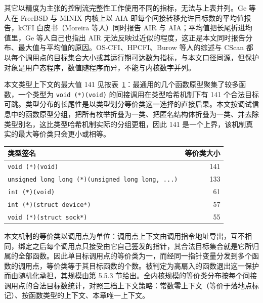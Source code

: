 其它以精度为主张的控制流完整性工作使用不同的指标，无法与上表并列。Ge 等人\citep{ge2016finegrained}在 FreeBSD 与 MINIX 内核上以 AIA 即每个间接转移允许目标数的平均值报告，kCFI 白皮书（Moreira 等人\citep{moreira2017droptherop}）同时报告 AIR 与 AIA；平均值把长尾折进均值里，Ge 等人自己也指出 AIR 无法反映过近似的程度，这正是本文同时报告分布、最大值与平均值的原因。OS-CFI\citep{khandaker2019oscfi}、HPCFI\citep{kasten2024hpcfi}、Burow 等人\citep{burow2017cfi}的综述与 CScan\citep{li2020cracks} 都以每个调用点的目标集合大小或其运行期可达数为指标，与本文口径同源，但保护对象是用户态程序，数值随程序而异，不能与内核数字并列。

本文类型上下文的最大值 141 见按表~\ref{tab:5-2}：最通用的几个函数原型聚集了较多函数，一个类型为 \lstinline[breaklines=false]@void (*)(void)@ 的间接调用在类型哈希机制下有 141 个合法目标可跳。类型分布的长尾性是以类型划分等价类这一选择的直接后果。本文按调试信息中的函数原型分组，把所有枚举折叠为一类、把匿名结构体折叠为一类、并去除类型别名，这比类型哈希机制实际的分组更粗，因此 141 是一个上界，该机制真实的最大等价类只会更小或相等。

\begin{table}[!htbp]
    \label{tab:5-2}
    \centering
    \footnotesize
    \setlength{\tabcolsep}{3pt}
    \renewcommand{\arraystretch}{1.25}
    \begin{tabular}{lr}
        \hline
        类型签名 & 等价类大小\\
        \hline
        \lstinline[breaklines=false]@void (*)(void)@ & 141\\
        \lstinline[breaklines=false]@unsigned long long (*)(unsigned long long, ...)@ & 133\\
        \lstinline[breaklines=false]@int (*)(void)@ & 61\\
        \lstinline[breaklines=false]@int (*)(struct device*)@ & 57\\
        \lstinline[breaklines=false]@void (*)(struct sock*)@ & 55\\
        \hline
    \end{tabular}
\end{table}

本文机制的等价类以调用点为单位：调用点上下文由调用指令地址导出，互不相同，绑定之后每个调用点只接受由它自己签发的指针，其合法目标集合就是它所归属的全部函数。因此单目标调用点的等价类为一，而经同一指针变量分发到多个函数的调用点，等价类等于其目标函数的个数。被判定为高扇入的函数退出这一保护而由随机化承担，其规模由第 5.5.3 节给出。全内核规模的等价类分布按每个间接调用点的合法目标数统计，对照三档上下文策略：常数零上下文（等价于落地点标记）、按函数类型的上下文、本章唯一上下文。

